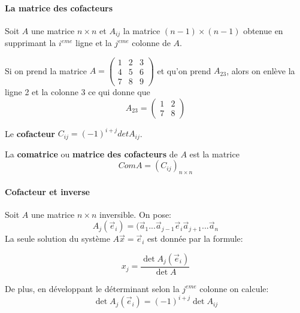 




\paragraph{La matrice des cofacteurs} Soit $A$ une matrice $n \times n$ et $A_{ij}$ la matrice $(n-1) \times (n-1)$ obtenue en supprimant la $i^{eme}$ ligne et la $j^{eme}$ colonne de $A$.
\\
\begin{exemple}
    Si on prend la matrice $A = \begin{pmatrix}
        1 & 2 & 3 \\
        4 & 5 & 6 \\
        7 & 8 & 9
    \end{pmatrix}$ et qu'on prend $A_{23}$, alors on enlève la ligne 2 et la colonne 3 ce qui donne que 
    \[ A_{23} = \begin{pmatrix}
        1 & 2 \\
        7 & 8
    \end{pmatrix}\]
    \begin{definition}
        Le \textbf{cofacteur} $C_{ij} = (-1)^{i+j}det A_{ij}$.
    \end{definition}
\end{exemple}
\begin{definition}
    
    La \textbf{comatrice} ou \textbf{matrice des cofacteurs} de $A$ est la matrice
    \[ComA = (C_{ij})_{n\times n}\]
\end{definition}

\paragraph{Cofacteur et inverse}
Soit $A$ une matrice $n \times n$ inversible. On pose:
\[A_j(\vec{e}_i) = (\vec{a}_1 ... \vec{a}_{j-1} \vec{e}_i \vec{a}_{j+1} ... \vec{a}_n\]
La seule solution du système $A\vec{x} = \vec{e}_i$ est donnée par la formule:
\begin{definition}
    \begin{equation*}
        x_j = \frac{\det A_j(\vec{e}_i)}{\det A}
    \end{equation*}
\end{definition}


De plus, en développant le déterminant selon la $j^{eme}$ colonne on calcule:
\[\det A_j(\vec{e}_i) = (-1)^{i+j}\det A_{ij}\]

